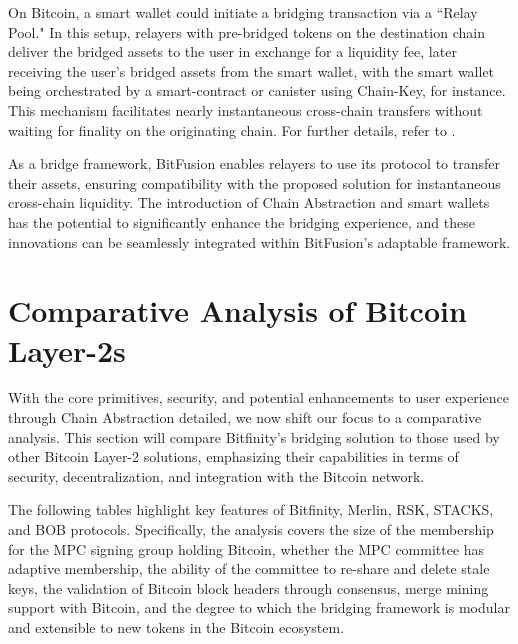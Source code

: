\documentclass{article}
\begin{document}
On Bitcoin, a smart wallet could initiate a bridging transaction via a ``Relay Pool." In this setup, relayers with pre-bridged tokens on the destination chain deliver the bridged assets to the user in exchange for a liquidity fee, later receiving the user’s bridged assets from the smart wallet, with the smart wallet being orchestrated by a smart-contract or canister using Chain-Key, for instance. This mechanism facilitates nearly instantaneous cross-chain transfers without waiting for finality on the originating chain. For further details, refer to \cite{uma}.

As a bridge framework, BitFusion enables relayers to use its protocol to transfer their assets, ensuring compatibility with the proposed solution for instantaneous cross-chain liquidity. The introduction of Chain Abstraction and smart wallets has the potential to significantly enhance the bridging experience, and these innovations can be seamlessly integrated within BitFusion's adaptable framework.

\section{Comparative Analysis of Bitcoin Layer-2s}

With the core primitives, security, and potential enhancements to user experience through Chain Abstraction detailed, we now shift our focus to a comparative analysis. This section will compare Bitfinity's bridging solution to those used by other Bitcoin Layer-2 solutions, emphasizing their capabilities in terms of security, decentralization, and integration with the Bitcoin network.

The following tables highlight key features of Bitfinity, Merlin, RSK, STACKS, and BOB protocols. Specifically, the analysis covers the size of the membership for the MPC signing group holding Bitcoin, whether the MPC committee has adaptive membership, the ability of the committee to re-share and delete stale keys, the validation of Bitcoin block headers through consensus, merge mining support with Bitcoin, and the degree to which the bridging framework is modular and extensible to new tokens in the Bitcoin ecosystem.


\vspace{1cm}
\end{document}
